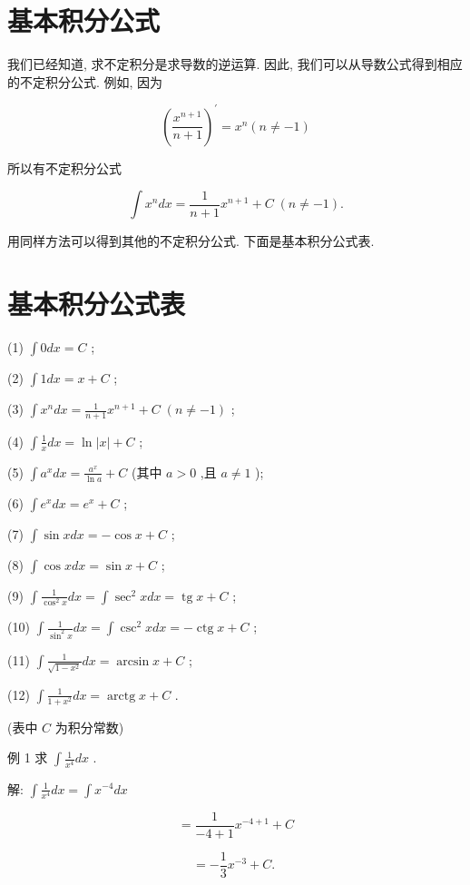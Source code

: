 \documentclass[lang=cn,newtx,12pt,scheme=chinese]{elegantbook}
\begin{document}
\section{基本积分公式}

我们已经知道, 求不定积分是求导数的逆运算. 因此, 我们可以从导数公式得到相应的不定积分公式. 例如, 因为

\[
{\left( \frac{{x}^{n + 1}}{n + 1}\right) }^{\prime } = {x}^{n}\left( {n \neq - 1}\right)
\]

所以有不定积分公式

\[
\int {x}^{n}{dx} = \frac{1}{n + 1}{x}^{n + 1} + C\;\left( {n \neq - 1}\right) .
\]

用同样方法可以得到其他的不定积分公式. 下面是基本积分公式表.

\section*{基本积分公式表}

(1) \(\int {0dx} = C\) ;

(2) \(\int {1dx} = x + C\) ;

(3) \(\int {x}^{n}{dx} = \frac{1}{n + 1}{x}^{n + 1} + C\;\left( {n \neq - 1}\right)\) ;

(4) \(\int \frac{1}{x}{dx} = \ln \left| x\right| + C\) ;

(5) \(\int {a}^{x}{dx} = \frac{{a}^{x}}{\ln a} + C\) (其中 \(a > 0\) ,且 \(a \neq 1\) );

(6) \(\int {e}^{x}{dx} = {e}^{x} + C\) ;

(7) \(\int \sin {xdx} = - \cos x + C\) ;

(8) \(\int \cos {xdx} = \sin x + C\) ;

(9) \(\int \frac{1}{{\cos }^{2}x}{dx} = \int {\sec }^{2}{xdx} = \operatorname{tg}x + C\) ;

(10) \(\int \frac{1}{{\sin }^{2}x}{dx} = \int {\csc }^{2}{xdx} = - \operatorname{ctg}x + C\) ;

(11) \(\int \frac{1}{\sqrt{1 - {x}^{2}}}{dx} = \arcsin x + C\) ;

(12) \(\int \frac{1}{1 + {x}^{2}}{dx} = \operatorname{arctg}x + C\) .

(表中 \(C\) 为积分常数)

例 1 求 \(\int \frac{1}{{x}^{4}}{dx}\) .

解: \(\int \frac{1}{{x}^{4}}{dx} = \int {x}^{-4}{dx}\)

\[
= \frac{1}{-4 + 1}{x}^{-4 + 1} + C
\]

\[
= - \frac{1}{3}{x}^{-3} + C\text{. }
\]
\end{document}
